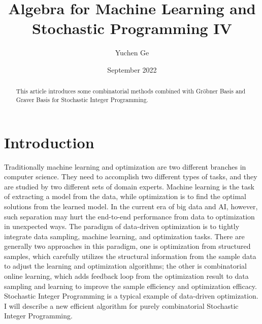\documentclass{article}
\title{Algebra for Machine Learning and Stochastic Programming IV}
\author{Yuchen Ge}
\date{September 2022}
\theoremstyle{plain}
\theoremstyle{definition}
\begin{document}
\maketitle
\tableofcontents
\newpage

\begin{abstract}
This article introduces some combinatorial methods combined with Gröbner Basis and Graver Basis for Stochastic Integer Programming.
\end{abstract}
\section{Introduction}
Traditionally machine learning and optimization are two different branches in computer science. They need to accomplish two different types of tasks, and they are studied by two different sets of domain experts. Machine learning is the task of extracting a model from the data, while optimization is to find the optimal solutions from the learned model. In the current era of big data and AI, however, such separation may hurt the end-to-end performance from data to optimization in unexpected ways. The paradigm of data-driven optimization is to tightly integrate data sampling, machine learning, and optimization tasks. There are generally two approaches in this paradigm, one is optimization from structured samples, which carefully utilizes the structural information from the sample data to adjust the learning and optimization algorithms; the other is combinatorial online learning, which adds feedback loop from the optimization result to data sampling and learning to improve the sample efficiency and optimization efficacy. Stochastic Integer Programming is a typical example of data-driven optimization. I will describe a new efficient algorithm for purely combinatorial Stochastic Integer Programming.
\end{document}
